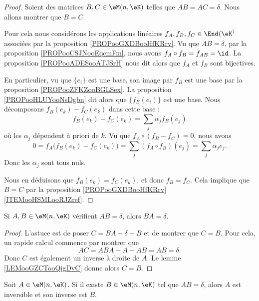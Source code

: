 \begin{proof}
    Soient des matrices \( B,C\in \eM(n,\eK)\) telles que \( AB=AC=\delta\). Nous allons montrer que \( B=C\).

    Pour cela nous considérons les applications linéaires \( f_A, f_B, f_C\in \End(\eK^)\) associées par la proposition \ref{PROPooGXDBooHfKRrv}. Vu que \( AB=\delta\), par la proposition \ref{PROPooCSJNooEqcmFm}, nous avons \( f_A\circ f_B = f_{AB}=\id\). La proposition \ref{PROPooADESooATJSrH} nous dit alors que \( f_A\) et \( f_B\) sont bijectives. 

    En particulier, vu que \( \{e_i\}\) est une base, son image par \( f_B\) est une base par la proposition \ref{PROPooZFKZooBGLSex}. La proposition \ref{PROPooHLUYooNsDgbn} dit alors que \( \{f_B(e_i)\}\) est une base. Nous décomposons \( f_B(e_k)-f_C(e_k)\) dans cette base :
    \begin{equation}
        f_B(e_k)-f_C(e_k)=\sum_j\alpha_jf_B(e_j)
    \end{equation}
    où les \( \alpha_j\) dépendent à priori de \( k\). Vu que \( f_A\circ(f_B-f_C)=0\), nous avons 
    \begin{equation}
        0=f_A\big( f_B(e_k)-f_C(e_k) \big)=\sum_j(f_A\circ f_B)(e_j)=\sum_j\alpha_je_j.
    \end{equation}
    Donc les \( \alpha_j\) sont tous nuls.

    Nous en déduisons que \( f_B(e_k)=f_C(e_k)\), et donc \( f_B=f_C\). Cela implique que \( B=C\) par la proposition \ref{PROPooGXDBooHfKRrv}\ref{ITEMooHSMLooRJZref}.
\end{proof}

\begin{proposition}      \label{PROPooECIIooVMCIwz}
    Si \( A,B\in \eM(n,\eK)\) vérifient \( AB=\delta\), alors \( BA=\delta\).
\end{proposition}

\begin{proof}
    L'astuce est de poser \( C=BA-\delta+B\) et de montrer que \( C=B\). Pour cela, un rapide calcul commence par montrer que
    \begin{equation}
        AC=ABA-A+AB=AB=\delta.
    \end{equation}
    Donc \( C\) est également un inverse à droite de \( A\). Le lemme \ref{LEMooGZCTooQigDvC} donne alors \( C=B\).
\end{proof}

\begin{corollary}       \label{CORooBQLXooTeVfgb}
    Soit \( A\in \eM(n,\eK)\). Si il existe \( B\in \eM(n,\eK)\) tel que \( AB=\delta\), alors \( A\) est inversible et son inverse est \( B\).
\end{corollary}

